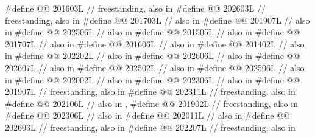 \begin{codeblock}
#define @@                            201603L // freestanding, also in 
#define @@             202603L // freestanding, also in 
#define @@                       201703L // also in 
#define @@                         201907L // also in 
#define @@                           202506L // also in 
#define @@                      201505L // also in 
#define @@                 201707L // also in 
#define @@              201606L // also in 
#define @@                201402L // also in 
#define @@                             202202L // also in 
#define @@                              202606L // also in 
#define @@                       202607L // also in 
#define @@                      202502L // also in 
#define @@                 202506L // also in 
#define @@           202002L // also in 
#define @@          202306L // also in 
#define @@                   201907L // freestanding, also in 
#define @@                              202311L // freestanding, also in 
#define @@                        202106L // also in , 
#define @@                             201902L // freestanding, also in 
#define @@          202306L // also in 
#define @@                        202011L // also in 
#define @@                    202603L // freestanding, also in 
#define @@                 202207L // freestanding, also in 

\end{codeblock}

